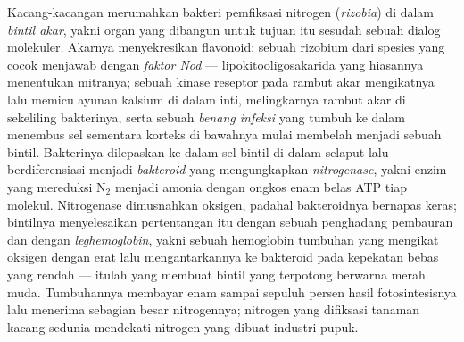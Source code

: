 \begin{definition}\label{def:b3:microbiomes:nodule}
%
Kacang-kacangan merumahkan bakteri pemfiksasi nitrogen (\emph{rizobia}) di
dalam \emph{bintil akar}, yakni organ yang dibangun untuk tujuan itu sesudah
sebuah dialog molekuler. Akarnya menyekresikan flavonoid; sebuah rizobium dari
spesies yang cocok menjawab dengan \emph{faktor Nod} ---
lipokitooligosakarida yang hiasannya menentukan mitranya; sebuah kinase
reseptor pada rambut akar mengikatnya lalu memicu ayunan kalsium di dalam inti,
melingkarnya rambut akar di sekeliling bakterinya, serta sebuah \emph{benang
infeksi} yang tumbuh ke dalam menembus sel sementara korteks di bawahnya mulai
membelah menjadi sebuah bintil. Bakterinya dilepaskan ke dalam sel bintil di
dalam selaput lalu berdiferensiasi menjadi \emph{bakteroid} yang mengungkapkan
\emph{nitrogenase}, yakni enzim yang mereduksi N$_{2}$ menjadi amonia dengan
ongkos enam belas ATP tiap molekul. Nitrogenase dimusnahkan oksigen, padahal
bakteroidnya bernapas keras; bintilnya menyelesaikan pertentangan itu dengan
sebuah penghadang pembauran dan dengan \emph{leghemoglobin}, yakni sebuah
hemoglobin tumbuhan yang mengikat oksigen dengan erat lalu mengantarkannya ke
bakteroid pada kepekatan bebas yang rendah --- itulah yang membuat bintil yang
terpotong berwarna merah muda. Tumbuhannya membayar enam sampai sepuluh persen
hasil fotosintesisnya lalu menerima sebagian besar nitrogennya; nitrogen
yang difiksasi tanaman kacang sedunia mendekati nitrogen yang dibuat industri
pupuk.
\end{definition}

